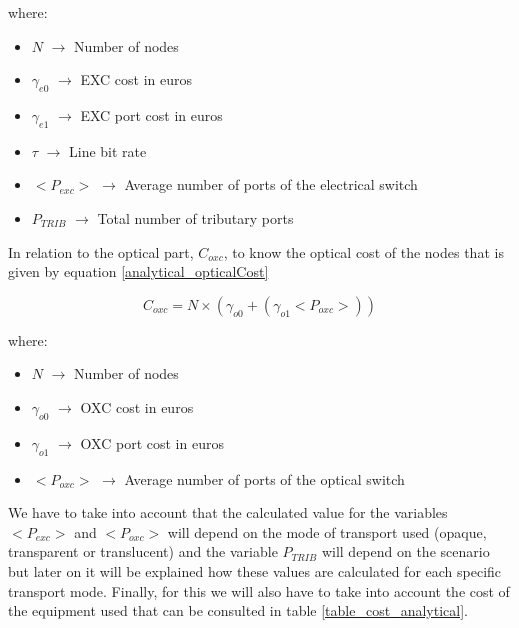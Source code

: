 \vspace{11pt}
\noindent
where:
\begin{itemize}
\item{$N$			$\rightarrow$	Number of nodes}
\item{$\gamma_{e0}$	$\rightarrow$	EXC cost in euros}
\item{$\gamma_{e1}$	$\rightarrow$	EXC port cost in euros}
\item{$\tau$		$\rightarrow$	Line bit rate}
\item{$<P_{exc}>$   $\rightarrow$   Average number of ports of the electrical switch}
\item{$P_{TRIB}$    $\rightarrow$   Total number of tributary ports}
\end{itemize}

\vspace{11pt}
In relation to the optical part, $C_{oxc}$, to know the optical cost of the nodes that is given by equation \ref{analytical_opticalCost}

\begin{equation}
C_{oxc} = N \times \left( \gamma_{o0} + \left( \gamma_{o1} <P_{oxc}> \right) \right)
\label{analytical_opticalCost}
\end{equation}

\vspace{11pt}
\noindent
where:
\begin{itemize}
\item{$N$			$\rightarrow$	Number of nodes}
\item{$\gamma_{o0}$	$\rightarrow$	OXC cost in euros}
\item{$\gamma_{o1}$	$\rightarrow$	OXC port cost in euros}
\item{$<P_{oxc}>$   $\rightarrow$   Average number of ports of the optical switch}
\end{itemize}

\vspace{11pt}
We have to take into account that the calculated value for the variables $<P_{exc}>$ and $<P_{oxc}>$ will depend on the mode of transport used (opaque, transparent or translucent) and the variable $P_{TRIB}$ will depend on the scenario but later on it will be explained how these values are calculated for each specific transport mode.
Finally, for this we will also have to take into account the cost of the equipment used that can be consulted in table \ref{table_cost_analytical}.\\

